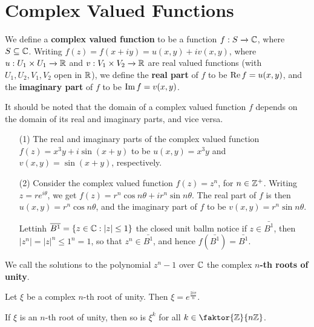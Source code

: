 \section{Complex Valued Functions}

\begin{definition}
    We define a \textbf{complex valued function} to be a function $f:S
    \xrightarrow{} \mathbb{C}$, where $S \subseteq \mathbb{C}$. Writing
    $f(z)=f(x+iy)=u(x,y)+iv(x,y)$, where $u:U_1 \times U_1 \xrightarrow{} \mathbb{R}$
    and $v:V_1 \times V_2 \xrightarrow{} \mathbb{R}$ are real valued functions (with
    $U_1,U_2,V_1,V_2$ open in $\mathbb{R}$), we define the \textbf{real part} of $f$ to be
    $\operatorname{Re}{f}=u(x,y)$, and the \textbf{imaginary part} of $f$ to be  $\operatorname{Im}{f}=v(x,y)$.
\end{definition}
\begin{remark}
    It should be noted that the domain of a complex valued function $f$ depends
    on the domain of its real and imaginary parts, and vice versa.
\end{remark}

\begin{example}\label{example_1}
    \begin{enumerate}
        \item[(1)] The real and imaginary parts of the complex valued function
            $f(z)=x^3y+i\sin{(x+y)}$ to be $u(x,y)=x^3y$ and
            $v(x,y)=\sin{(x+y)}$, respectively.

        \item[(2)] Consider the complex valued function $f(z)=z^n$, for $n \in
            \mathbb{Z}^+$. Writing  $z=re^{i\theta}$, we get
            $f(z)=r^n\cos{n\theta}+ir^n\sin{n\theta}$. The real part of $f$ is
            then  $u(x,y)=r^n\cos{n\theta}$, and the imaginary part of $f$ to be
             $v(x,y)=r^n\sin{n\theta}$.

             Lettinh $\overline{B^1}=\{z \in \mathbb{C} : |z| \leq 1\}$ the closed unit ballm
             notice if $z \in \bar{B^1}$, then $|z^n|=|z|^n \leq 1^n=1$, so that
              $z^n \in \bar{B^1}$, and hence $f(\bar{B^1})=\bar{B^1}$.
    \end{enumerate}
\end{example}

\begin{definition}
    We call the solutions to the polynomial $z^n-1$ over $\mathbb{C}$ the complex
    \textbf{$n$-th roots of unity}.
\end{definition}

\begin{theorem}\label{1.2.1}
    Let $\xi$ be a complex $n$-th root of unity. Then $\xi=e^{\frac{2i\pi}{n}}$.
\end{theorem}
\begin{corollary}
    If $\xi$ is an  $n$-th root of unity, then so is  $\xi^k$ for all  $k \in
    \faktor{\Z}{n\Z}$.
\end{corollary}
